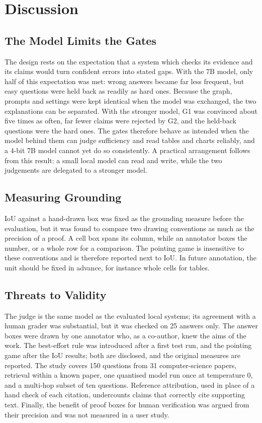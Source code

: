 \section{Discussion}
\label{sec:discussion}

\subsection{The Model Limits the Gates}

The design rests on the expectation that a system which checks its evidence and its
claims would turn confident errors into stated gaps. With the 7B model, only half of
this expectation was met: wrong answers became far less frequent, but easy questions
were held back as readily as hard ones. Because the graph, prompts and settings were
kept identical when the model was exchanged, the two explanations can be separated.
With the stronger model, G1 was convinced about five times as often, far fewer claims
were rejected by G2, and the held-back questions were the hard ones. The gates
therefore behave as intended when the model behind them can judge sufficiency and read
tables and charts reliably, and a 4-bit 7B model cannot yet do so consistently. A
practical arrangement follows from this result: a small local model can read and
write, while the two judgements are delegated to a stronger model.

\subsection{Measuring Grounding}

IoU against a hand-drawn box was fixed as the grounding measure before the evaluation,
but it was found to compare two drawing conventions as much as the precision of a
proof. A cell box spans its column, while an annotator boxes the number, or a whole
row for a comparison. The pointing game is insensitive to these conventions and is
therefore reported next to IoU. In future annotation, the unit should be fixed in
advance, for instance whole cells for tables.

\subsection{Threats to Validity}

The judge is the same model as the evaluated local systems; its agreement with a human
grader was substantial, but it was checked on 25 answers only. The answer boxes were
drawn by one annotator who, as a co-author, knew the aims of the work. The best-effort
rule was introduced after a first test run, and the pointing game after the IoU
results; both are disclosed, and the original measures are reported. The study covers
150 questions from 31 computer-science papers, retrieval within a known paper, one
quantised model run once at temperature 0, and a multi-hop subset of ten questions.
Reference attribution, used in place of a hand check of each citation, undercounts
claims that correctly cite supporting text. Finally, the benefit of proof boxes for
human verification was argued from their precision and was not measured in a user
study.
